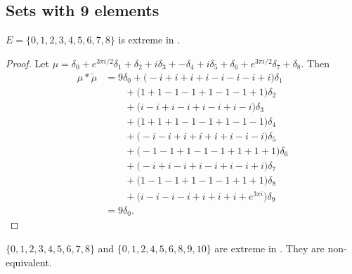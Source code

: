 \break


\subsection{Sets with 9 elements}
 
  
\begin{prop}\label{prop9in10}
$E=\{0,1,2,3,4,5,6,7,8\}$ is extreme in .
\end{prop}

\begin{proof} Let $\mu =
 \delta_{0}  +   e^{ 3\pi i  / 2}\delta_{1}  +  \delta_{2}  +    i \delta_{3}  +    -\delta_{4}  +    i \delta_{5}  +  \delta_{6}  +   e^{ 3\pi i  / 2}\delta_{7}  +  \delta_{8}
.$
  Then
\begin{align*} \mu * \tilde\mu&=   9\delta_{0}     +  \big( -i +  i +  i +  i - i- i- i+  i \big)\delta_{1} \\& \qquad +  \big( 1+1-1- 1 +1-1- 1 + 1\big)\delta_{2} \\& \qquad +  \big(  i - i+  i - i+  i - i+  i - i\big)\delta_{3} \\& \qquad +  \big( 1+ 1+1-1- 1 +1-1- 1 \big)\delta_{4} \\& \qquad +  \big( -i - i+  i +  i +  i +  i - i- i\big)\delta_{5} \\& \qquad +  \big(  -1 - 1 +1-1- 1 + 1+ 1+ 1\big)\delta_{6} \\& \qquad +  \big( -i +  i - i+  i - i+  i - i+  i \big)\delta_{7} \\& \qquad +  \big(1-1- 1 +1-1- 1 + 1+ 1\big)\delta_{8} \\& \qquad +  \big(  i - i- i- i+  i +  i +  i + e^{ 3 \pi i}\big)\delta_{9}
\\&= 9\delta_0.
\end{align*}

\end{proof}



\begin{prop}\label{prop9in12}
$\{0,1,2,3,4,5,6,7,8\}$ and $\{0,1,2,4,5,6,8,9,10\}$ are extreme in . They are  non-equivalent. 
\end{prop}

